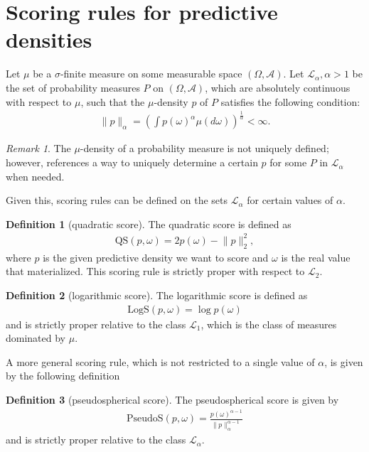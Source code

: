 \documentclass{def/tuberlin}
\theoremstyle{definition}
\newtheorem{definition}{Definition}[section]
\theoremstyle{remark}
\newtheorem*{remark}{Remark}
\begin{document}
\section{Scoring rules for predictive densities}
Let $\mu$ be a $\sigma$-finite measure on some measurable space $(\Omega,\mathcal A)$. Let $\mathcal L_\alpha, \alpha>1$ be the set of probability measures $P$ on $(\Omega,\mathcal A)$, which are absolutely continuous with respect to $\mu$, such that the $\mu$-density $p$ of $P$ satisfies the following condition: \begin{align*}
    \lVert p\rVert_\alpha = \left(\int p(\omega)^\alpha \mu(d\omega)\right)^\frac{1}{\alpha}<\infty.
\end{align*}
\begin{remark}
    The $\mu$-density of a probability measure is not uniquely defined; however, \cite{Gneiting} references a way to uniquely determine a certain $p$ for some $P$ in $\mathcal{L}_\alpha$ when needed.
\end{remark}
Given this, scoring rules can be defined on the sets $\mathcal L_\alpha$ for certain values of $\alpha$.
\begin{definition}[quadratic score]
    The quadratic score is defined as \begin{align*}
        \text{QS}(p,\omega)=2p(\omega)-\lVert p\rVert_2^2,
    \end{align*}
    where $p$ is the given predictive density we want to score and $\omega$ is the real value that materialized. This scoring rule is strictly proper with respect to $\mathcal L_2$.
\end{definition}
\begin{definition}[logarithmic score]
    The logarithmic score is defined as \begin{align*}
        \text{LogS}(p,\omega)=\log p(\omega)
    \end{align*}
    and is strictly proper relative to the class $\mathcal L_1$, which is the class of measures dominated by $\mu$.
\end{definition}
A more general scoring rule, which is not restricted to a single value of $\alpha$, is given by the following definition 
\begin{definition}[pseudospherical score]
The pseudospherical score is given by \begin{align*}
    \text{PseudoS}(p,\omega)=\frac{p(\omega)^{\alpha-1}}{\lVert p\rVert_\alpha^{\alpha-1}}
\end{align*}
and is strictly proper relative to the class $\mathcal L_\alpha$.
\end{definition}
\end{document}
